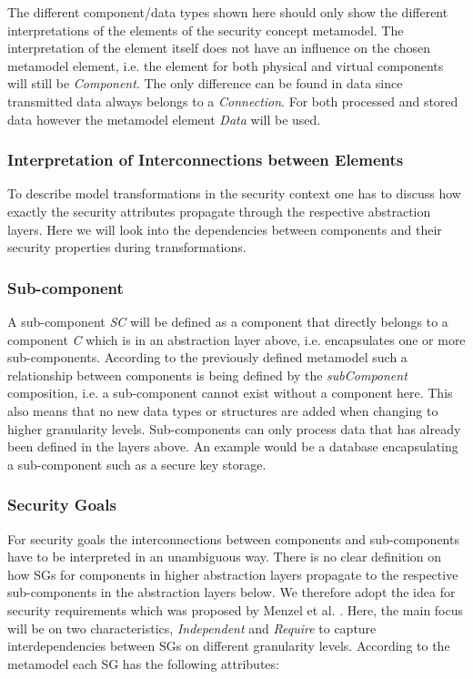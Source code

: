 The different component/data types shown here should only show the different interpretations of the elements of the security concept metamodel. The interpretation of the element itself does not have an influence on the chosen metamodel element, i.e. the element for both physical and virtual components will still be \textit{Component}. The only difference can be found in data since transmitted data always belongs to a \textit{Connection}. For both processed and stored data however the metamodel element \textit{Data} will be used.

\subsubsection{Interpretation of Interconnections between Elements}

To describe model transformations in the security context one has to discuss how exactly the security attributes propagate through the respective abstraction layers. Here we will look into the dependencies between components and their security properties during transformations.

\subsubsection*{Sub-component}
\label{subsubsec:sub_comp}
A sub-component \textit{SC} will be defined as a component that directly belongs to a component \textit{C} which is in an abstraction layer above, i.e. encapsulates one or more sub-components. According to the previously defined metamodel such a relationship between components is being defined by the \textit{subComponent} composition, i.e. a sub-component cannot exist without a component here. This also means that no new data types or structures are added when changing to higher granularity levels. Sub-components can only process data that has already been defined in the layers above. An example would be a database encapsulating a sub-component such as a secure key storage.   

\subsubsection*{Security Goals}
\label{subsubsec:sec_goal}
For security goals the interconnections between components and sub-components have to be interpreted in an unambiguous way. There is no clear definition on how SGs for components in higher abstraction layers propagate to the respective sub-components in the abstraction layers below. We therefore adopt the idea for security requirements which was proposed by Menzel et al. \cite{Menzel2008}. Here, the main focus will be on two characteristics, \textit{Independent} and \textit{Require} to capture interdependencies between SGs on different granularity levels. According to the metamodel each SG has the following attributes:

